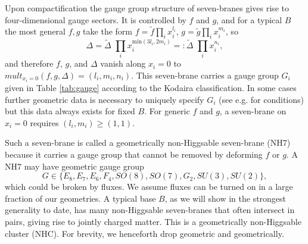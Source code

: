 \documentclass[aps,prl,twocolumn, superscriptaddress,groupedaddress,nofootinbib]{revtex4-1}
\begin{document}
Upon compactification the gauge group structure of seven-branes gives rise
to four-dimensional gauge sectors. It is controlled by $f$ and
$g$, and for a typical $B$ the most general $f, g$ take the
form $f=\tilde f \prod_i x_i^{l_i}$, $g=\tilde g \prod_i x_i^{m_i}$,
so
\begin{equation}
\Delta = \tilde \Delta\,\,  \prod_i x_i^{\text{min}(3l_i,2m_i)}=: \tilde \Delta\,\,  \prod_i x_i^{n_i},
\end{equation}
and therefore $f$, $g$, and $\Delta$ vanish along $x_i=0$ to 
$mult_{x_i=0}(f,g,\Delta)=(l_i,m_i,n_i).$ This seven-brane carries
a gauge group $G_i$ given in Table \ref{tab:gauge}
according to the Kodaira classification. In some cases
further geometric data is necessary to uniquely 
specify $G_i$ (see e.g. 
\cite{Halverson:2015jua} for conditions) but this data
always exists for fixed $B$. 
For generic $f$ and $g$, a seven-brane on $x_i=0$
requires $(l_i,m_i)\geq(1,1)$.

Such a seven-brane is called a geometrically non-Higgsable
seven-brane (NH7) because it carries a gauge group that cannot
be removed by deforming $f$ or $g$. A NH7 may have geometric gauge group
\begin{equation}
G\in \{E_8,E_7,E_6,F_4,SO(8),SO(7),G_2,SU(3),SU(2)\}, \nonumber
\end{equation} 
which could be broken by fluxes. We assume fluxes can be turned on in a large fraction
of our geometries.
A typical base $B$, as
we will show in the strongest generality to date, has many non-Higgsable seven-branes
that often intersect in pairs, giving rise to jointly charged
matter. This is a geometrically
non-Higgsable cluster (NHC). For brevity, we henceforth drop 
geometric and geometrically.
\end{document}
